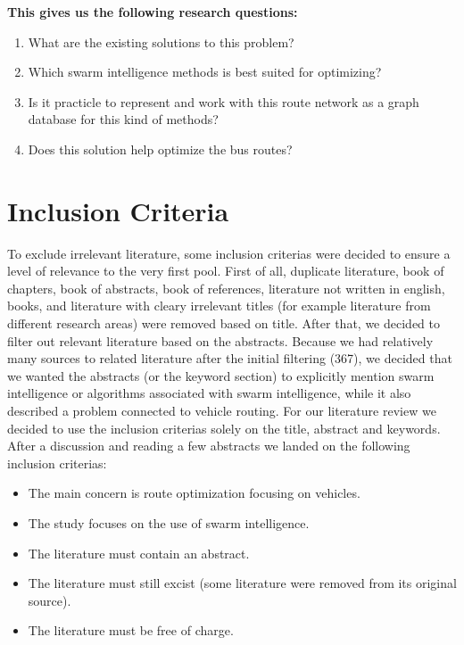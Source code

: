 \textbf{This gives us the following research questions:}
\begin{enumerate}
\item What are the existing solutions to this problem?
\item Which swarm intelligence methods is best suited for optimizing? 
\item Is it practicle to represent and work with this route network as a graph database for this kind of methods?
\item Does this solution help optimize the bus routes? 
\end{enumerate}




\section{Inclusion Criteria}
To exclude irrelevant literature, some inclusion criterias were decided to ensure a level of relevance to the very first pool. First of all, duplicate literature, book of chapters, book of abstracts, book of references, literature not written in english, books, and literature with cleary irrelevant titles (for example literature from different research areas) were removed based on title. After that, we decided to filter out relevant literature based on the abstracts. Because we had relatively many sources to related literature after the initial filtering (367), we decided that we wanted the abstracts (or the keyword section) to explicitly mention swarm intelligence or algorithms associated with swarm intelligence, while it also described a problem connected to vehicle routing. For our literature review we decided to use the inclusion criterias solely on the title, abstract and keywords. After a discussion and reading a few abstracts we landed on the following inclusion criterias:
\begin{itemize}
\item The main concern is route optimization focusing on vehicles. 
\item The study focuses on the use of swarm intelligence.
\item The literature must contain an abstract. 
\item The literature must still excist (some literature were removed from its original source).
\item The literature must be free of charge.
\end{itemize}

